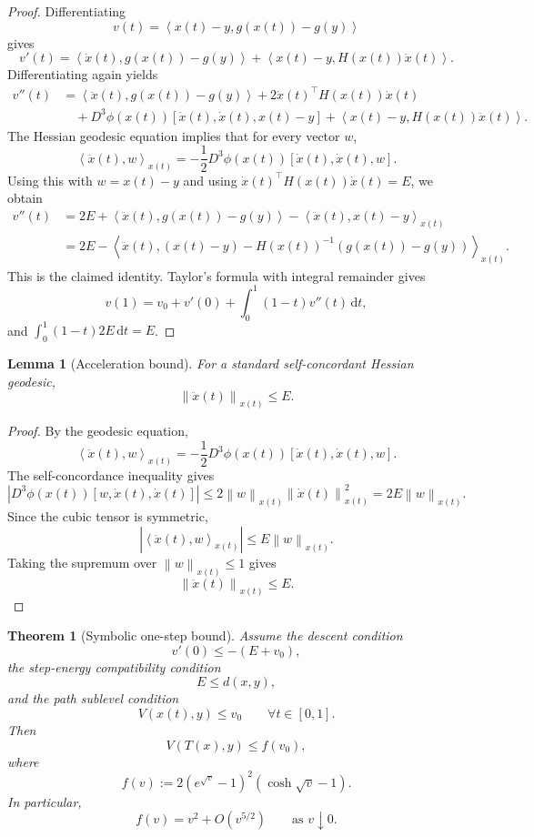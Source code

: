 \documentclass[11pt]{article}
\newtheorem{theorem}{Theorem}
\newtheorem{lemma}{Lemma}
\newcommand{\ip}[2]{\left\langle #1,#2\right\rangle}
\newcommand{\norm}[1]{\left\lVert #1\right\rVert}
\newcommand{\dd}{\mathrm d}
\begin{document}
\begin{proof}
Differentiating
\[
    v(t)=\ip{x(t)-y}{g(x(t))-g(y)}
\]
gives
\[
    v'(t)
    =
    \ip{\dot x(t)}{g(x(t))-g(y)}
    +
    \ip{x(t)-y}{H(x(t))\dot x(t)}.
\]
Differentiating again yields
\[
\begin{aligned}
    v''(t)
    &=
    \ip{\ddot x(t)}{g(x(t))-g(y)}
    +2\dot x(t)^\top H(x(t))\dot x(t) \\
    &\quad
    +D^3\phi(x(t))[\dot x(t),\dot x(t),x(t)-y]
    +\ip{x(t)-y}{H(x(t))\ddot x(t)}.
\end{aligned}
\]
The Hessian geodesic equation implies that for every vector $w$,
\[
    \ip{\ddot x(t)}{w}_{x(t)}
    =
    -\frac12D^3\phi(x(t))[\dot x(t),\dot x(t),w].
\]
Using this with $w=x(t)-y$ and using
$\dot x(t)^\top H(x(t))\dot x(t)=E$, we obtain
\[
\begin{aligned}
    v''(t)
    &=
    2E
    +\ip{\ddot x(t)}{g(x(t))-g(y)}
    -\ip{\ddot x(t)}{x(t)-y}_{x(t)} \\
    &=
    2E
    -\ip{\ddot x(t)}{(x(t)-y)-H(x(t))^{-1}(g(x(t))-g(y))}_{x(t)}.
\end{aligned}
\]
This is the claimed identity. Taylor's formula with integral remainder gives
\[
    v(1)=v_0+v'(0)+\int_0^1(1-t)v''(t)\,\dd t,
\]
and $\int_0^1(1-t)2E\,\dd t=E$.
\end{proof}

\begin{lemma}[Acceleration bound]
\label{lem:acceleration}
For a standard self-concordant Hessian geodesic,
\[
    \norm{\ddot x(t)}_{x(t)}\le E.
\]
\end{lemma}

\begin{proof}
By the geodesic equation,
\[
    \ip{\ddot x(t)}{w}_{x(t)}
    =
    -\frac12D^3\phi(x(t))[\dot x(t),\dot x(t),w].
\]
The self-concordance inequality gives
\[
    |D^3\phi(x(t))[w,\dot x(t),\dot x(t)]|
    \le
    2\norm{w}_{x(t)}\norm{\dot x(t)}_{x(t)}^2
    =
    2E\norm{w}_{x(t)}.
\]
Since the cubic tensor is symmetric,
\[
    |\ip{\ddot x(t)}{w}_{x(t)}|
    \le
    E\norm{w}_{x(t)}.
\]
Taking the supremum over $\norm{w}_{x(t)}\le1$ gives
\[
    \norm{\ddot x(t)}_{x(t)}\le E.
\]
\end{proof}

\begin{theorem}[Symbolic one-step bound]
\label{thm:symbolic}
Assume the descent condition
\[
    v'(0)
    \le
    -(E+v_0),
\]
the step-energy compatibility condition
\[
    E\le d(x,y),
\]
and the path sublevel condition
\[
    V(x(t),y)
    \le
    v_0
    \qquad
    \forall t\in[0,1].
\]
Then
\[
    V(T(x),y)
    \le
    f(v_0),
\]
where
\[
    f(v)
    :=
    2\left(e^{\sqrt v}-1\right)^2
    \left(\cosh\sqrt v-1\right).
\]
In particular,
\[
    f(v)=v^2+O(v^{5/2})
    \qquad
    \text{as }v\downarrow0.
\]
\end{theorem}
\end{document}
